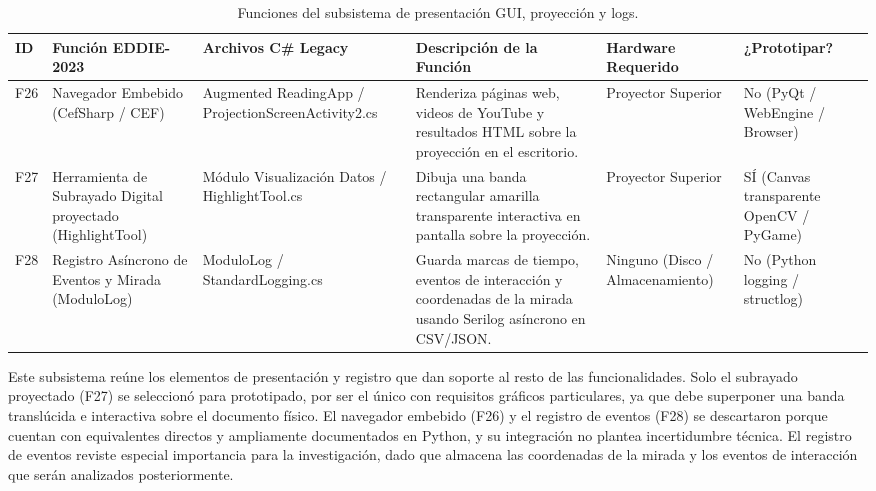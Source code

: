 \begin{table}[H]
    \centering
    \caption{Funciones del subsistema de presentación GUI, proyección y logs.}
    \label{tab:func_gui_proyeccion}
    \begin{small}
    \begin{tabular}{|L{0.6cm}|L{2.2cm}|L{2.2cm}|L{4.1cm}|L{1.6cm}|L{1.8cm}|}
        \hline
        \textbf{ID} & \textbf{Función EDDIE-2023} & \textbf{Archivos C\# Legacy} & \textbf{Descripción de la Función} & \textbf{Hardware Requerido} & \textbf{¿Prototipar?} \\ \hline
        F26 & Navegador Embebido (CefSharp / CEF) & Augmented ReadingApp / ProjectionScreenActivity2.cs & Renderiza páginas web, videos de YouTube y resultados HTML sobre la proyección en el escritorio. & Proyector Superior & No (PyQt / WebEngine / Browser) \\ \hline
        F27 & Herramienta de Subrayado Digital proyectado (HighlightTool) & Módulo Visualización Datos / HighlightTool.cs & Dibuja una banda rectangular amarilla transparente interactiva en pantalla sobre la proyección. & Proyector Superior & SÍ (Canvas transparente OpenCV / PyGame) \\ \hline
        F28 & Registro Asíncrono de Eventos y Mirada (ModuloLog) & ModuloLog / StandardLogging.cs & Guarda marcas de tiempo, eventos de interacción y coordenadas de la mirada usando Serilog asíncrono en CSV/JSON. & Ninguno (Disco / Almacenamiento) & No (Python  logging /  structlog) \\ \hline
    \end{tabular}
    \end{small}
\end{table}
 
Este subsistema reúne los elementos de presentación y registro que dan soporte al resto de las funcionalidades. Solo el subrayado proyectado (F27) se seleccionó para prototipado, por ser el único con requisitos gráficos particulares, ya que debe superponer una banda translúcida e interactiva sobre el documento físico. El navegador embebido (F26) y el registro de eventos (F28) se descartaron porque cuentan con equivalentes directos y ampliamente documentados en Python, y su integración no plantea incertidumbre técnica. El registro de eventos reviste especial importancia para la investigación, dado que almacena las coordenadas de la mirada y los eventos de interacción que serán analizados posteriormente.
 
